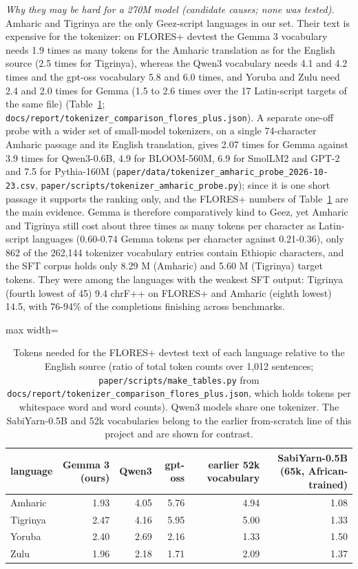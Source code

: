 \emph{Why they may be hard for a 270M model (candidate causes; none was tested).} Amharic and Tigrinya are the only Ge\textquotesingle ez-script languages in our set. Their text is expensive for the tokenizer: on FLORES+ devtest the Gemma 3 vocabulary needs 1.9 times as many tokens for the Amharic translation as for the English source (2.5 times for Tigrinya), whereas the Qwen3 vocabulary needs 4.1 and 4.2 times and the gpt-oss vocabulary 5.8 and 6.0 times, and Yoruba and Zulu need 2.4 and 2.0 times for Gemma (1.5 to 2.6 times over the 17 Latin-script targets of the same file) (Table~\ref{tab:t_tokcost}; \texttt{docs/report/tokenizer\_comparison\_flores\_plus.json}). A separate one-off probe with a wider set of small-model tokenizers, on a single 74-character Amharic passage and its English translation, gives 2.07 times for Gemma against 3.9 times for Qwen3-0.6B, 4.9 for BLOOM-560M, 6.9 for SmolLM2 and GPT-2 and 7.5 for Pythia-160M (\texttt{paper/data/tokenizer\_amharic\_probe\_2026-10-23.csv}, \texttt{paper/scripts/tokenizer\_amharic\_probe.py}); since it is one short passage it supports the ranking only, and the FLORES+ numbers of Table~\ref{tab:t_tokcost} are the main evidence. Gemma is therefore comparatively kind to Ge\textquotesingle ez, yet Amharic and Tigrinya still cost about three times as many tokens per character as Latin-script languages (0.60-0.74 Gemma tokens per character against 0.21-0.36), only 862 of the 262,144 tokenizer vocabulary entries contain Ethiopic characters, and the SFT corpus holds only 8.29 M (Amharic) and 5.60 M (Tigrinya) target tokens. They were among the languages with the weakest SFT output: Tigrinya (fourth lowest of 45) 9.4 chrF++ on FLORES+ and Amharic (eighth lowest) 14.5, with 76-94\% of the completions finishing across benchmarks.

\begin{table}[t]
\centering
\footnotesize
\setlength{\tabcolsep}{3pt}
\caption{Tokens needed for the FLORES+ devtest text of each language relative to the English source (ratio of total token counts over 1,012 sentences; \texttt{paper/scripts/make\_tables.py} from \texttt{docs/report/tokenizer\_comparison\_flores\_plus.json}, which holds tokens per whitespace word and word counts). Qwen3 models share one tokenizer. The SabiYarn-0.5B and 52k vocabularies belong to the earlier from-scratch line of this project and are shown for contrast.}
\label{tab:t_tokcost}
\begin{adjustbox}{max width=\linewidth}
{\def\LTcaptype{none} %
\begin{tabular}{@{}lrrrrr@{}}
\toprule
language & Gemma 3 (ours) & Qwen3 & gpt-oss & earlier 52k vocabulary & SabiYarn-0.5B (65k, African-trained) \\
\midrule
Amharic & 1.93 & 4.05 & 5.76 & 4.94 & 1.08 \\
Tigrinya & 2.47 & 4.16 & 5.95 & 5.00 & 1.33 \\
Yoruba & 2.40 & 2.69 & 2.16 & 1.33 & 1.50 \\
Zulu & 1.96 & 2.18 & 1.71 & 2.09 & 1.37 \\
\bottomrule
\end{tabular}
}
\end{adjustbox}
\end{table}

